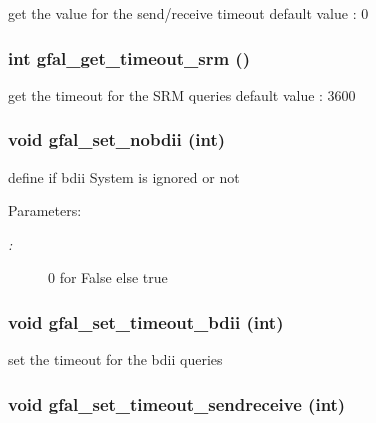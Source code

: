 get the value for the send/receive timeout default value : 0 
\subsubsection{\setlength{\rightskip}{0pt plus 5cm}int gfal\_\-get\_\-timeout\_\-srm ()}\label{group__common__group_g31f524748949fca765e6fb8aa20ef41c}


get the timeout for the SRM queries default value : 3600 
\subsubsection{\setlength{\rightskip}{0pt plus 5cm}void gfal\_\-set\_\-nobdii (int)}\label{group__common__group_g267920b468d7578c10aa25469f8cadf7}


define if bdii System is ignored or not 

\begin{Desc}
\item[Parameters:]
\begin{description}
\item[{\em :}]0 for False else true \end{description}
\end{Desc}
\subsubsection{\setlength{\rightskip}{0pt plus 5cm}void gfal\_\-set\_\-timeout\_\-bdii (int)}\label{group__common__group_g7fc461515a2cdf649fd516319cb54ea9}


set the timeout for the bdii queries 
\subsubsection{\setlength{\rightskip}{0pt plus 5cm}void gfal\_\-set\_\-timeout\_\-sendreceive (int)}\label{group__common__group_gedd91bb343f17bc2c0ba9db1203f1819}


